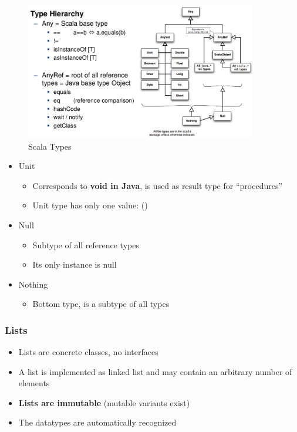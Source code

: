 \begin{figure}[H]
\centering
\includegraphics[width=0.9\textwidth]{figures/scalaTypes.png}
\caption{Scala Types}
\end{figure}

\clearpage
\begin{itemize}
\tightlist
\item
  Unit

  \begin{itemize}
  \tightlist
  \item
    Corresponds to \textbf{void in Java}, is used as result type for
    ``procedures''
  \item
    Unit type has only one value: ()
  \end{itemize}
\item
  Null

  \begin{itemize}
  \tightlist
  \item
    Subtype of all reference types
  \item
    Its only instance is null
  \end{itemize}
\item
  Nothing

  \begin{itemize}
  \tightlist
  \item
    Bottom type, is a subtype of all types
  \end{itemize}
\end{itemize}

\hypertarget{lists}{%
\subsubsection{Lists}\label{lists}}

\begin{itemize}
\tightlist
\item
  Lists are concrete classes, no interfaces
\item
  A list is implemented as linked list and may contain an arbitrary
  number of elements
\item
  \textbf{Lists are immutable} (mutable variants exist)
\item
  The datatypes are automatically recognized
\end{itemize}


